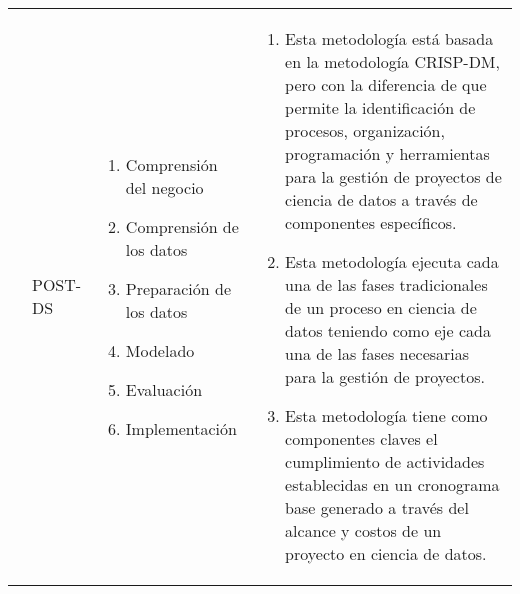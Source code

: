 \begin{table*}
\begin{threeparttable}
\begin{tabular}{ p{2cm} p{4cm} p{5cm} p{6cm}  }
			\citep{Costa2020}
			&POST-DS
			&  \begin{enumerate}
				\item Comprensión del negocio
				\item Comprensión de los datos
				\item Preparación de los datos
				\item Modelado
				\item Evaluación 
				\item Implementación 
			\end{enumerate}
			& \begin{enumerate}
				\item Esta metodología está basada en la metodología CRISP-DM, pero con la diferencia de que permite la identificación de procesos, organización, programación y herramientas para la gestión de proyectos de ciencia de datos a través de componentes específicos.
				\item Esta metodología ejecuta cada una de las fases tradicionales de un proceso en ciencia de datos teniendo como eje cada una de las fases necesarias para la gestión de proyectos.
				\item Esta metodología tiene como componentes claves el cumplimiento de actividades establecidas en un cronograma base generado a través del alcance y costos de un proyecto en ciencia de datos.
			\end{enumerate}
		\end{tabular}
	\end{threeparttable}
\end{table*}

